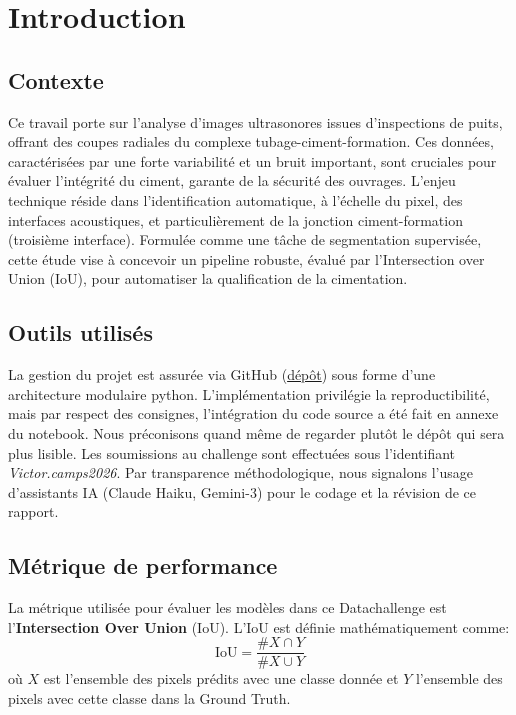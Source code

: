 \section{Introduction}

\subsection{Contexte}

Ce travail porte sur l'analyse d'images ultrasonores issues d'inspections de puits, offrant des coupes radiales du complexe tubage-ciment-formation. Ces données, caractérisées par une forte variabilité et un bruit important, sont cruciales pour évaluer l'intégrité du ciment, garante de la sécurité des ouvrages. L'enjeu technique réside dans l'identification automatique, à l'échelle du pixel, des interfaces acoustiques, et particulièrement de la jonction ciment-formation (troisième interface). Formulée comme une tâche de segmentation supervisée, cette étude vise à concevoir un pipeline robuste, évalué par l'Intersection over Union (IoU), pour automatiser la qualification de la cimentation.


\subsection{Outils utilisés}

La gestion du projet est assurée via GitHub (\href{https://github.com/victorcamps70/deep-datachallenge}{dépôt}) sous forme d'une architecture modulaire python. L'implémentation privilégie la reproductibilité, mais par respect des consignes, l'intégration du code source a été fait en annexe du notebook. Nous préconisons quand même de regarder plutôt le dépôt qui sera plus lisible. Les soumissions au challenge sont effectuées sous l'identifiant \textit{Victor.camps2026}. Par transparence méthodologique, nous signalons l'usage d'assistants IA (Claude Haiku, Gemini-3) pour le codage et la révision de ce rapport.

\subsection{Métrique de performance}

La métrique utilisée pour évaluer les modèles dans ce
Datachallenge est
l'\textbf{Intersection Over Union} (IoU).
L'IoU est définie mathématiquement comme:
\[
    \text{IoU} = \frac{\# X \cap Y}{\# X \cup Y}
\]
où $X$ est l’ensemble des pixels prédits avec une classe
donnée et $Y$ l’ensemble des pixels avec
cette classe dans la Ground Truth.